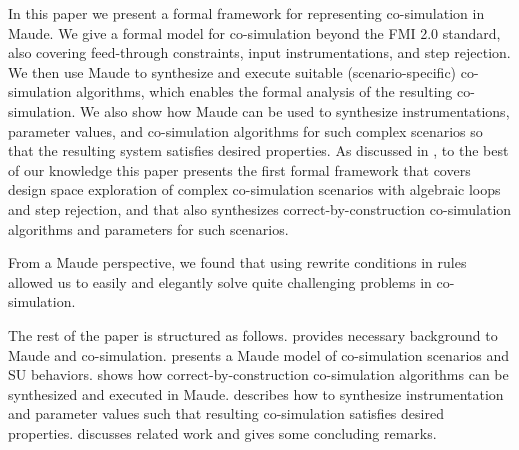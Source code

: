 In this paper we present a formal framework for representing
co-simulation in Maude. 
We give a formal model for co-simulation beyond the FMI 2.0 standard, 
also covering  feed-through constraints, input instrumentations, and
step rejection.  
We then use Maude to synthesize and execute suitable
(scenario-specific) 
co-simulation  algorithms, which enables the formal analysis of the
resulting  co-simulation. 
We also show how Maude can be used to synthesize
instrumentations,  parameter values,  and co-simulation algorithms for
such complex  scenarios so that the resulting system satisfies
desired properties. 
% 
As discussed in , to the best of our
knowledge this paper presents  the first formal
framework that covers  design space exploration of complex
co-simulation scenarios  with algebraic loops and step
rejection,  and that also  synthesizes correct-by-construction
co-simulation algorithms and  parameters for  such  scenarios.

From a Maude perspective, we found that using rewrite conditions in
 rules  allowed us to  easily and
elegantly  solve quite   challenging problems in co-simulation.


The rest of the paper is structured as follows.
 provides  necessary background to Maude and
co-simulation. 
 presents a Maude model of co-simulation
scenarios and SU  behaviors.
 shows how correct-by-construction co-simulation
algorithms can be  synthesized and executed in Maude.
 describes how to synthesize instrumentation and
parameter values such  that resulting co-simulation satisfies desired
properties. 
 discusses related work and  gives some
concluding  remarks.